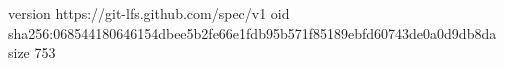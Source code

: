 version https://git-lfs.github.com/spec/v1
oid sha256:068544180646154dbee5b2fe66e1fdb95b571f85189ebfd60743de0a0d9db8da
size 753
